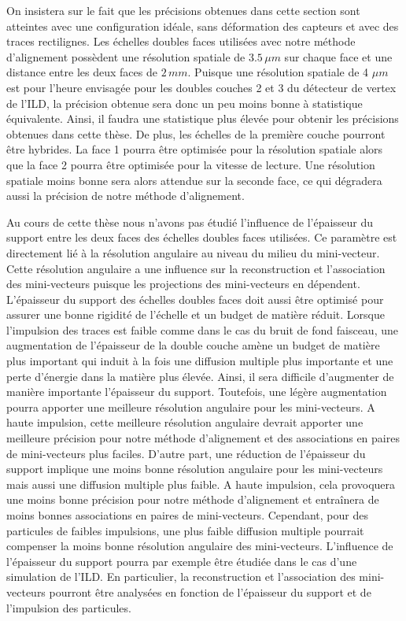   \medskip
  
  On insistera sur le fait que les précisions obtenues dans cette section sont atteintes avec une configuration id\'eale, sans déformation des capteurs et avec des traces rectilignes. Les \'echelles doubles faces utilis\'ees avec notre m\'ethode d'alignement poss\`edent une r\'esolution spatiale de $3.5 \, \mu m$ sur chaque face et une distance entre les deux faces de $2 \, mm$. Puisque une r\'esolution spatiale de 4 $\mu m$ est pour l'heure envisag\'ee pour les doubles couches 2 et 3 du d\'etecteur de vertex de l'ILD, la pr\'ecision obtenue sera donc un peu moins bonne \`a statistique \'equivalente. Ainsi, il faudra une statistique plus \'elev\'ee pour obtenir les pr\'ecisions obtenues dans cette th\`ese. De plus, les \'echelles de la premi\`ere couche pourront \^etre hybrides. La face 1 pourra \^etre optimis\'ee pour la r\'esolution spatiale alors que la face 2 pourra \^etre optimis\'ee pour la vitesse de lecture. Une r\'esolution spatiale moins bonne sera alors attendue sur la seconde face, ce qui d\'egradera aussi la pr\'ecision de notre m\'ethode d'alignement.
  
  \medskip
  
  Au cours de cette th\`ese nous n'avons pas \'etudi\'e l'influence de l'\'epaisseur du support entre les deux faces des \'echelles doubles faces utilis\'ees. Ce param\`etre est directement li\'e \`a la r\'esolution angulaire au niveau du milieu du mini-vecteur. Cette r\'esolution angulaire a une influence sur la reconstruction et l'association des mini-vecteurs puisque les projections des mini-vecteurs en d\'ependent. L'\'epaisseur du support des \'echelles doubles faces doit aussi \^etre optimis\'e pour assurer une bonne rigidit\'e de l'\'echelle et un budget de mati\`ere r\'eduit. Lorsque l'impulsion des traces est faible comme dans le cas du bruit de fond faisceau, une augmentation de l'épaisseur de la double couche am\`ene un budget de mati\`ere plus important qui induit \`a la fois une diffusion multiple plus importante et une perte d'\'energie dans la mati\`ere plus \'elev\'ee. Ainsi, il sera difficile d'augmenter de mani\`ere importante l'\'epaisseur du support. Toutefois, une l\'eg\`ere augmentation pourra apporter une meilleure r\'esolution angulaire pour les mini-vecteurs. A haute impulsion, cette meilleure r\'esolution angulaire devrait apporter une meilleure pr\'ecision pour notre m\'ethode d'alignement et des associations en paires de mini-vecteurs plus faciles. D'autre part, une r\'eduction de l'\'epaisseur du support implique une moins bonne r\'esolution angulaire pour les mini-vecteurs mais aussi une diffusion multiple plus faible. A haute impulsion, cela provoquera une moins bonne pr\'ecision pour notre m\'ethode d'alignement et entraînera de moins bonnes associations en paires de mini-vecteurs. Cependant, pour des particules de faibles impulsions, une plus faible diffusion multiple pourrait compenser la moins bonne r\'esolution angulaire des mini-vecteurs. L'influence de l'\'epaisseur du support pourra par exemple \^etre \'etudi\'ee dans le cas d'une simulation de l'ILD. En particulier, la reconstruction et l'association des mini-vecteurs pourront \^etre analys\'ees en fonction de l'\'epaisseur du support et de l'impulsion des particules.
    
